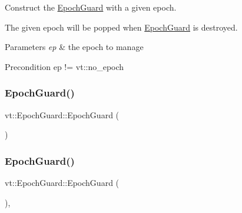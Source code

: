 Construct the \hyperlink{structvt_1_1_epoch_guard}{Epoch\+Guard} with a given epoch. 

The given epoch will be popped when \hyperlink{structvt_1_1_epoch_guard}{Epoch\+Guard} is destroyed.


\begin{DoxyParams}{Parameters}
{\em ep} & the epoch to manage\\
\hline
\end{DoxyParams}
\begin{DoxyPrecond}{Precondition}
ep != vt\+::no\+\_\+epoch 
\end{DoxyPrecond}
\mbox{\label{structvt_1_1_epoch_guard_a04f94ad13c6c3e709427adea95293ab6}} 
\subsubsection{\texorpdfstring{Epoch\+Guard()}{EpochGuard()}\hspace{0.1cm}{\footnotesize\ttfamily [2/3]}}
{\footnotesize\ttfamily vt\+::\+Epoch\+Guard\+::\+Epoch\+Guard (\begin{DoxyParamCaption}\item[{const \hyperlink{structvt_1_1_epoch_guard}{Epoch\+Guard} \&}]{ }\end{DoxyParamCaption})\hspace{0.3cm}{\ttfamily [delete]}}

\mbox{\label{structvt_1_1_epoch_guard_a0a59db6f3b1d71c397f64a37ed43fd40}} 
\subsubsection{\texorpdfstring{Epoch\+Guard()}{EpochGuard()}\hspace{0.1cm}{\footnotesize\ttfamily [3/3]}}
{\footnotesize\ttfamily vt\+::\+Epoch\+Guard\+::\+Epoch\+Guard (\begin{DoxyParamCaption}\item[{\hyperlink{structvt_1_1_epoch_guard}{Epoch\+Guard} \&\&}]{ }\end{DoxyParamCaption})\hspace{0.3cm}{\ttfamily [default]}, {\ttfamily [noexcept]}}

